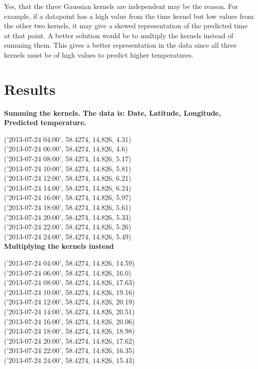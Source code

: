 \documentclass[a4paper,titlepage,12pt]{article}
\begin{document}
Yes, that the three Gaussian kernels are independent may be the reason. For
example, if a datapoint has a high value from the time kernel but low values
from the other two kernels, it may give a skewed representation of the predicted
time at that point.
A better solution would be to multiply the kernels instead
of summing them. This gives a better representation in the data since all three
kernels must be of high values to predict higher temperatures. 

\section{Results}

\textbf{Summing the kernels. The data is: Date, Latitude, Longitude, Predicted temperature.}

('2013-07-24 04:00', 58.4274, 14.826, 4.31) \\
('2013-07-24 06:00', 58.4274, 14.826, 4.6) \\
('2013-07-24 08:00', 58.4274, 14.826, 5.17) \\
('2013-07-24 10:00', 58.4274, 14.826, 5.81) \\
('2013-07-24 12:00', 58.4274, 14.826, 6.21) \\
('2013-07-24 14:00', 58.4274, 14.826, 6.24) \\
('2013-07-24 16:00', 58.4274, 14.826, 5.97) \\
('2013-07-24 18:00', 58.4274, 14.826, 5.61) \\
('2013-07-24 20:00', 58.4274, 14.826, 5.33) \\
('2013-07-24 22:00', 58.4274, 14.826, 5.26) \\
('2013-07-24 24:00', 58.4274, 14.826, 5.49) \\

\textbf{Multiplying the kernels instead}

('2013-07-24 04:00', 58.4274, 14.826, 14.59) \\
('2013-07-24 06:00', 58.4274, 14.826, 16.0) \\
('2013-07-24 08:00', 58.4274, 14.826, 17.63) \\
('2013-07-24 10:00', 58.4274, 14.826, 19.16) \\
('2013-07-24 12:00', 58.4274, 14.826, 20.19) \\
('2013-07-24 14:00', 58.4274, 14.826, 20.51) \\
('2013-07-24 16:00', 58.4274, 14.826, 20.06) \\
('2013-07-24 18:00', 58.4274, 14.826, 18.98) \\
('2013-07-24 20:00', 58.4274, 14.826, 17.62) \\
('2013-07-24 22:00', 58.4274, 14.826, 16.35) \\
('2013-07-24 24:00', 58.4274, 14.826, 15.43) \\
\end{document}
